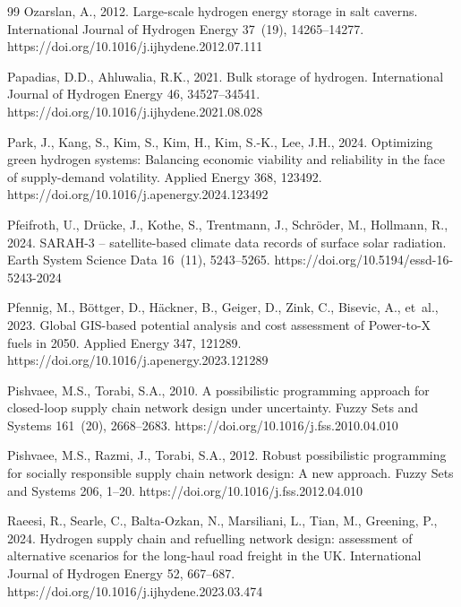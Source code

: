 \documentclass[preprint,12pt,authoryear]{elsarticle}
\begin{document}
\begin{thebibliography}{99}
Ozarslan, A., 2012. Large-scale hydrogen energy storage in salt caverns. International Journal of Hydrogen Energy 37~(19), 14265--14277. https://doi.org/10.1016/j.ijhydene.2012.07.111

Papadias, D.D., Ahluwalia, R.K., 2021. Bulk storage of hydrogen. International Journal of Hydrogen Energy 46, 34527--34541. https://doi.org/10.1016/j.ijhydene.2021.08.028

Park, J., Kang, S., Kim, S., Kim, H., Kim, S.-K., Lee, J.H., 2024. Optimizing green hydrogen systems: Balancing economic viability and reliability in the face of supply-demand volatility. Applied Energy 368, 123492. https://doi.org/10.1016/j.apenergy.2024.123492

Pfeifroth, U., Dr{\"u}cke, J., Kothe, S., Trentmann, J., Schr{\"o}der, M., Hollmann, R., 2024. SARAH-3 -- satellite-based climate data records of surface solar radiation. Earth System Science Data 16~(11), 5243--5265. https://doi.org/10.5194/essd-16-5243-2024

Pfennig, M., B{\"o}ttger, D., H{\"a}ckner, B., Geiger, D., Zink, C., Bisevic, A., et~al., 2023. Global GIS-based potential analysis and cost assessment of Power-to-X fuels in 2050. Applied Energy 347, 121289. https://doi.org/10.1016/j.apenergy.2023.121289

Pishvaee, M.S., Torabi, S.A., 2010. A possibilistic programming approach for closed-loop supply chain network design under uncertainty. Fuzzy Sets and Systems 161~(20), 2668--2683. https://doi.org/10.1016/j.fss.2010.04.010

Pishvaee, M.S., Razmi, J., Torabi, S.A., 2012. Robust possibilistic programming for socially responsible supply chain network design: A new approach. Fuzzy Sets and Systems 206, 1--20. https://doi.org/10.1016/j.fss.2012.04.010

Raeesi, R., Searle, C., Balta-Ozkan, N., Marsiliani, L., Tian, M., Greening, P., 2024. Hydrogen supply chain and refuelling network design: assessment of alternative scenarios for the long-haul road freight in the UK. International Journal of Hydrogen Energy 52, 667--687. https://doi.org/10.1016/j.ijhydene.2023.03.474


\end{thebibliography}
\end{document}
